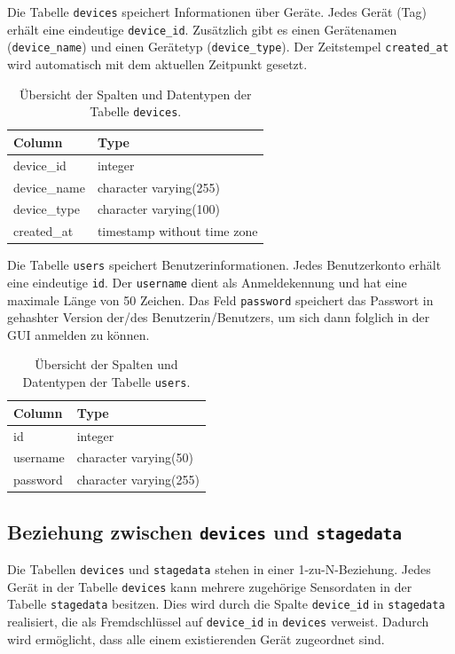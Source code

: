 \newpage
Die Tabelle \texttt{devices} speichert Informationen über Geräte. Jedes Gerät (Tag) erhält eine eindeutige \texttt{device\_id}. Zusätzlich gibt es einen Gerätenamen (\texttt{device\_name}) und einen Gerätetyp (\texttt{device\_type}). Der Zeitstempel \texttt{created\_at} wird automatisch mit dem aktuellen Zeitpunkt gesetzt.
\begin{table}[h]
	\centering
	\begin{tabular}{|l|l|}
		\hline
		\textbf{Column} & \textbf{Type} \\
		\hline
		device\_id & integer \\
		\hline
		device\_name & character varying(255) \\
		\hline
		device\_type & character varying(100) \\
		\hline
		created\_at & timestamp without time zone \\
		\hline
	\end{tabular}
	\caption{Übersicht der Spalten und Datentypen der Tabelle \texttt{devices}.}
	\label{tab:devices}
\end{table}

Die Tabelle \texttt{users} speichert Benutzerinformationen. Jedes Benutzerkonto erhält eine eindeutige \texttt{id}. Der \texttt{username} dient als Anmeldekennung und hat eine maximale Länge von 50 Zeichen. Das Feld \texttt{password} speichert das Passwort in gehashter Version der/des Benutzerin/Benutzers, um sich dann folglich in der GUI anmelden zu können.
\begin{table}[H]
	\centering
	\begin{tabular}{|l|l|}
		\hline
		\textbf{Column} & \textbf{Type} \\
		\hline
		id & integer \\
		\hline
		username & character varying(50) \\
		\hline
		password & character varying(255) \\
		\hline
	\end{tabular}
	\caption{Übersicht der Spalten und Datentypen der Tabelle \texttt{users}.}
	\label{tab:users}
\end{table}

\subsection{Beziehung zwischen \texttt{devices} und \texttt{stagedata}}

Die Tabellen \texttt{devices} und \texttt{stagedata} stehen in einer 1-zu-N-Beziehung. Jedes Gerät in der Tabelle \texttt{devices} kann mehrere zugehörige Sensordaten in der Tabelle \texttt{stagedata} besitzen. Dies wird durch die Spalte \texttt{device\_id} in \texttt{stagedata} realisiert, die als Fremdschlüssel auf \texttt{device\_id} in \texttt{devices} verweist. Dadurch wird ermöglicht, dass alle einem existierenden Gerät zugeordnet sind. 

